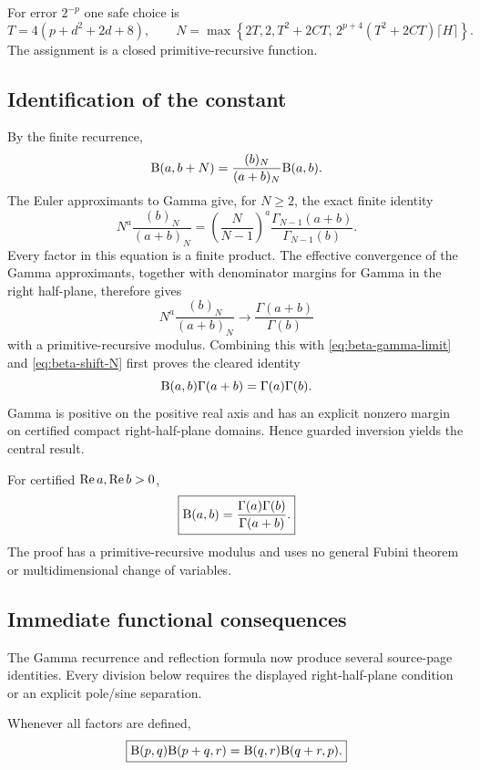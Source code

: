 For error $2^{-p}$ one safe choice is
\[
 T=4(p+d^2+2d+8),\qquad
 N=\max\!\left\{2T,2,T^2+2CT,\,
 2^{p+4}(T^2+2CT)\lceil H\rceil\right\}.
\]
The assignment is a closed primitive-recursive function.

\subsection{Identification of the constant}

By the finite recurrence,
\begin{equation}
 \mathrm B(a,b+N)=\frac{(b)_N}{(a+b)_N}\mathrm B(a,b).
 \label{eq:beta-shift-N}
\end{equation}
The Euler approximants to Gamma give, for $N\ge2$, the exact finite identity
\begin{equation}
 N^a\frac{(b)_N}{(a+b)_N}
 =\left(\frac{N}{N-1}\right)^a
   \frac{\Gamma_{N-1}(a+b)}{\Gamma_{N-1}(b)}.
 \label{eq:euler-ratio-exact}
\end{equation}
Every factor in this equation is a finite product.  The effective convergence of the Gamma approximants, together with denominator margins for Gamma in the right half-plane, therefore gives
\[
 N^a\frac{(b)_N}{(a+b)_N}\longrightarrow
 \frac{\Gamma(a+b)}{\Gamma(b)}
\]
with a primitive-recursive modulus.  Combining this with \eqref{eq:beta-gamma-limit} and \eqref{eq:beta-shift-N} first proves the cleared identity
\[
 \mathrm B(a,b)\Gamma(a+b)=\Gamma(a)\Gamma(b).
\]
Gamma is positive on the positive real axis and has an explicit nonzero margin on certified compact right-half-plane domains.  Hence guarded inversion yields the central result.

\begin{theorem}\label{thm:beta-gamma}
For certified $\operatorname{Re} a,\operatorname{Re} b>0$,
\[
 \boxed{\mathrm B(a,b)=\frac{\Gamma(a)\Gamma(b)}{\Gamma(a+b)}.}
\]
The proof has a primitive-recursive modulus and uses no general Fubini theorem or multidimensional change of variables.
\end{theorem}

\subsection{Immediate functional consequences}

The Gamma recurrence and reflection formula now produce several source-page identities.  Every division below requires the displayed right-half-plane condition or an explicit pole/sine separation.

\begin{corollary}\label{cor:beta-assoc}
Whenever all factors are defined,
\[
 \boxed{\mathrm B(p,q)\mathrm B(p+q,r)=\mathrm B(q,r)\mathrm B(q+r,p).}
\]
\end{corollary}

